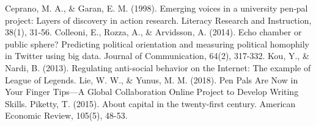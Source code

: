 \documentclass[12pt, final]{article}
\begin{document}
  \begin{thebibliography}{1}
   Ceprano, M. A., \& Garan, E. M. (1998). Emerging voices in a university pen‐pal project: Layers of discovery in action research. Literacy Research and Instruction, 38(1), 31-56.
   Colleoni, E., Rozza, A., \& Arvidsson, A. (2014). Echo chamber or public sphere? Predicting political orientation and measuring political homophily in Twitter using big data. Journal of Communication, 64(2), 317-332.
  Kou, Y., \& Nardi, B. (2013). Regulating anti-social behavior on the Internet: The example of League of Legends.
   Lie, W. W., \& Yunus, M. M. (2018). Pen Pals Are Now in Your Finger Tips—A Global Collaboration Online Project to Develop Writing Skills.
   Piketty, T. (2015). About capital in the twenty-first century. American Economic Review, 105(5), 48-53.
  \end{thebibliography}
\end{document}
